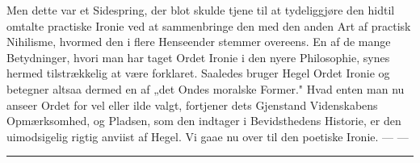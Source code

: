 \documentclass[12pt]{article}
\newcommand{\ombreak}{\par\medskip\begin{center}\rule{0.32\textwidth}{0.4pt}\end{center}\medskip}
\begin{document}
Men dette var et Sidespring, der blot skulde tjene til at tydeliggjøre den hidtil omtalte practiske Ironie ved at sammenbringe den med den anden Art af practisk Nihilisme, hvormed den i flere Henseender stemmer overeens. En af de mange Betydninger, hvori man har taget Ordet Ironie i den nyere Philosophie, synes hermed tilstrækkelig at være forklaret. Saaledes bruger Hegel Ordet Ironie og betegner altsaa dermed en af „det Ondes moralske Former." Hvad enten man nu anseer Ordet for vel eller ilde valgt, fortjener dets Gjenstand Videnskabens Opmærksomhed, og Pladsen, som den indtager i Bevidsthedens Historie, er den uimodsigelig rigtig anviist af Hegel. Vi gaae nu over til den poetiske Ironie. --- ---

\ombreak
\end{document}
